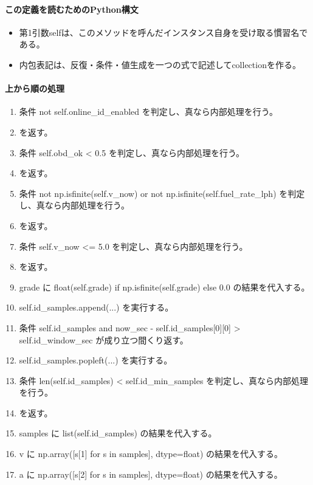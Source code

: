 \documentclass[a4paper,11pt]{article}
\begin{document}
            \paragraph{この定義を読むためのPython構文}
            \begin{itemize}[leftmargin=1.6em]
            \item 第1引数selfは、このメソッドを呼んだインスタンス自身を受け取る慣習名である。
\item 内包表記は、反復・条件・値生成を一つの式で記述してcollectionを作る。
            \end{itemize}
            \paragraph{上から順の処理}
            \begin{enumerate}[leftmargin=1.8em]
            \item 条件 not self.online\_id\_enabled を判定し、真なら内部処理を行う。
\item    を返す。
\item 条件 self.obd\_ok < 0.5 を判定し、真なら内部処理を行う。
\item    を返す。
\item 条件 not np.isfinite(self.v\_now) or not np.isfinite(self.fuel\_rate\_lph) を判定し、真なら内部処理を行う。
\item    を返す。
\item 条件 self.v\_now <= 5.0 を判定し、真なら内部処理を行う。
\item    を返す。
\item grade に float(self.grade) if np.isfinite(self.grade) else 0.0 の結果を代入する。
\item self.id\_samples.append(...) を実行する。
\item 条件 self.id\_samples and now\_sec - self.id\_samples[0][0] > self.id\_window\_sec が成り立つ間くり返す。
\item   self.id\_samples.popleft(...) を実行する。
\item 条件 len(self.id\_samples) < self.id\_min\_samples を判定し、真なら内部処理を行う。
\item    を返す。
\item samples に list(self.id\_samples) の結果を代入する。
\item v に np.array([s[1] for s in samples], dtype=float) の結果を代入する。
\item a に np.array([s[2] for s in samples], dtype=float) の結果を代入する。

\end{enumerate}
\end{document}
